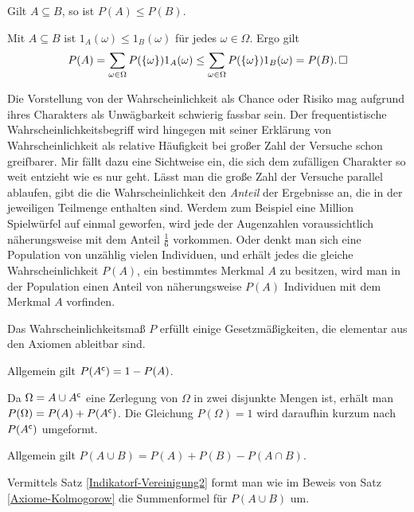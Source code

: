 \begin{Satz}\label{Monotonie-P}
Gilt $A\subseteq B$, so ist $P(A)\le P(B)$.
\end{Satz}
\begin{Beweis}
Mit $A\subseteq B$ ist $1_A(\omega)\le 1_B(\omega)$ für jedes $\omega\in\Omega$.
Ergo gilt
\[P(A) = \sum_{\omega\in\Omega} P(\{\omega\})1_A(\omega)
\le \sum_{\omega\in\Omega} P(\{\omega\})1_B(\omega) = P(B).\,\Box\]
\end{Beweis}

\noindent
Die Vorstellung von der Wahrscheinlichkeit als Chance oder Risiko
mag aufgrund ihres Charakters als Unwägbarkeit schwierig fassbar sein.
Der frequentistische Wahrscheinlichkeitsbegriff wird hingegen mit seiner
Erklärung von Wahrscheinlichkeit als relative Häufigkeit bei großer
Zahl der Versuche schon greifbarer. Mir fällt dazu eine Sichtweise ein,
die sich dem zufälligen Charakter so weit entzieht wie es nur geht.
Lässt man die große Zahl der Versuche parallel ablaufen, gibt die
die Wahrscheinlichkeit den \emph{Anteil} der Ergebnisse an, die in
der jeweiligen Teilmenge enthalten sind. Werdem zum Beispiel eine
Million Spielwürfel auf einmal geworfen, wird jede der Augenzahlen
voraussichtlich näherungsweise mit dem Anteil $\frac{1}{6}$ vorkommen.
Oder denkt man sich eine Population von unzählig vielen Individuen,
und erhält jedes die gleiche Wahrscheinlichkeit $P(A)$, ein
bestimmtes Merkmal $A$ zu besitzen, wird man in der Population einen
Anteil von näherungsweise $P(A)$ Individuen mit dem Merkmal $A$ vorfinden.

Das Wahrscheinlichkeitsmaß $P$ erfüllt einige Gesetzmäßigkeiten, die
elementar aus den Axiomen ableitbar sind.

\begin{Satz}
Allgemein gilt $P(A^\mathsf c) = 1 - P(A)$.
\end{Satz}
\begin{Beweis}
Da $\Omega = A\cup A^\mathsf c$ eine Zerlegung von $\Omega$ in zwei
disjunkte Mengen ist, erhält man $P(\Omega)=P(A)+P(A^\mathsf c)$.
Die Gleichung $P(\Omega)=1$ wird daraufhin kurzum nach $P(A^\mathsf c)$
umgeformt.\,\qedsymbol
\end{Beweis}

\begin{Satz}\label{Inklusion-Exklusion-zwei}
Allgemein gilt $P(A\cup B) = P(A) + P(B) - P(A\cap B)$.
\end{Satz}
\begin{Beweis}
Vermittels Satz \ref{Indikatorf-Vereinigung2} formt man wie im Beweis
von Satz \ref{Axiome-Kolmogorow} die Summenformel für
$P(A\cup B)$ um.\,\qedsymbol
\end{Beweis}

